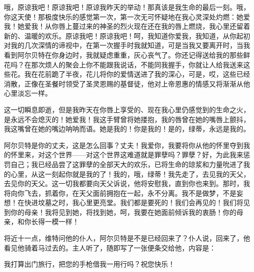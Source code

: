 \documentclass[12pt,oneside]{book}
\begin{document}
哦，原谅我吧！原谅我吧！原谅我昨天的举动！那真该是我生命的最后一刻。哦，你这天使！那极度快乐的感觉第一次，第一次无可怀疑地在我心灵深处灼燃：她爱我！她爱我！从你唇上蔓过来的神圣的烈火现在还在我的唇上燃烧，我心里还留着新的、温暖的欢乐。原谅我吧！原谅我吧！呵，我知道你爱我，我知道，从你起初对我的几次深情的谛视中，在第一次握手时我就知道，可是当我又要离开时，当我看到阿尔贝特在你身边时，我就疑虑重重，灰心丧气了。你还记得送给我的那些鲜花吗？在那次烦人的聚会上你不能跟我说话，不能同我握手，你就让人给我送来这些花。我在花前跪了半夜，花儿将你的爱情送进了我的深心，可是，哎，这些已经消散，正像在圣餐时领受了圣灵恩赐的基督徒，他对上帝恩惠的情感又将渐渐从他心里淡忘一样。

这一切瞬息即逝，但是我昨天在你唇上享受的、现在我心里仍感觉到的生命之火，是永远不会熄灭的！她爱我！我这手臂曾将她搂抱，我的唇曾在她的嘴唇上颤抖，我这嘴曾在她的嘴边呐呐而语。她是我的！你是我的！是的，绿蒂，永远是我的。

阿尔贝特是你的丈夫，这是怎么回事？丈夫！我爱你，我要将你从他的怀里夺到我的怀里来，对这个世界——对这个世界这难道就是罪孽吗？罪孽？好，为此我来惩罚自己；我已经品尝了这罪孽的全部天大的欢乐，已将生命的琼浆和力量吮进了我的心里，从这一刻起你就是我的了！我的，哦，绿蒂！我先走了，去见我的天父，去见你的天父。这一切我都要向天父诉说，他将安慰我，直到你也来到。那时，我将向你飞去，抓着你，在天父面前拥抱在一起，永不分离。我不是做梦，不是妄想！在快进坟墓之时，我心里更亮堂。我们都是要死的！我们会再见的！我们将见到你的母亲！我将见到她，将找到她，呵，我要在她面前倾诉我的衷肠！你的母亲，和你长得一模一样！

\begin{framed}
将近十一点，维特问他的仆人，阿尔贝特是不是已经回来了？仆人说，回来了，他看见他骑着马过去的。主人听了，随即写了一张便条交给他，内容是：
\end{framed}

我打算出门旅行，把您的手枪借我一用行吗？祝您快乐！
\end{document}
